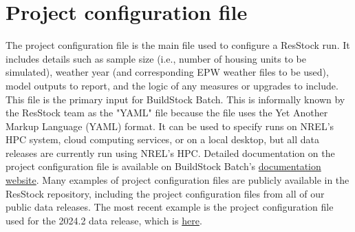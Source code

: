 \section{Project configuration file} \label{sec:project_config_file}
The project configuration file is the main file used to configure a ResStock run. It includes details such as sample size (i.e., number of housing units to be simulated), weather year (and corresponding EPW weather files to be used), model outputs to report, and the logic of any measures or upgrades to include. This file is the primary input for BuildStock Batch. This is informally known by the ResStock team as the "YAML" file because the file uses the Yet Another Markup Language (YAML) format. It can be used to specify runs on NREL's HPC system, cloud computing services, or on a local desktop, but all data releases are currently run using NREL's HPC.  Detailed documentation on the project configuration file is available on BuildStock Batch's  \href{https://buildstockbatch.readthedocs.io/en/v2023.10.0/project_defn.html}{documentation website}. Many examples of project configuration files are publicly available in the ResStock repository, including the project configuration files from all of our public data releases. The most recent example is the project configuration file used for the 2024.2 data release, which is \href{https://github.com/NREL/resstock/blob/v3.2.0-2024.2/project_national/EUSSRR2_project_500k_AMY2018.yml}{here}. 

